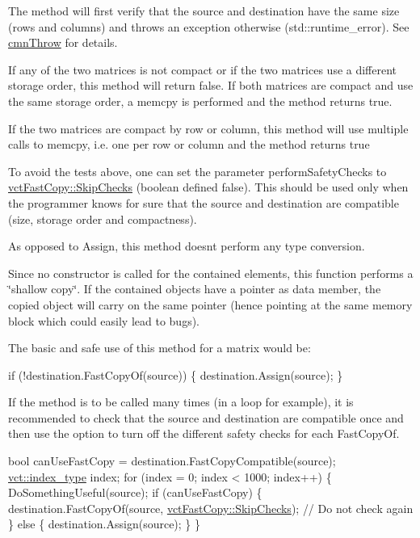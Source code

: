 \begin{DoxyItemize}
\item The method will first verify that the source and destination have the same size (rows and columns) and throws an exception otherwise ({\ttfamily std\+::runtime\+\_\+error}). See \hyperlink{cmn_throw_8h_a6fe29a0b6f112fe0032896bb904f8377}{cmn\+Throw} for details.
\item If any of the two matrices is not compact or if the two matrices use a different storage order, this method will return {\ttfamily false}. If both matrices are compact and use the same storage order, a {\ttfamily memcpy} is performed and the method returns {\ttfamily true}.
\item If the two matrices are compact by row or column, this method will use multiple calls to {\ttfamily memcpy}, i.\+e. one per row or column and the method returns {\ttfamily true}
\item To avoid the tests above, one can set the parameter {\ttfamily perform\+Safety\+Checks} to {\ttfamily \hyperlink{classvct_fast_copy_a221c1b0117c8dcf51332ad84f4e0fda5}{vct\+Fast\+Copy\+::\+Skip\+Checks}} (boolean defined {\ttfamily false}). This should be used only when the programmer knows for sure that the source and destination are compatible (size, storage order and compactness).
\item As opposed to Assign, this method doesn\textquotesingle{}t perform any type conversion.
\item Since no constructor is called for the contained elements, this function performs a \char`\"{}shallow copy\char`\"{}. If the contained objects have a pointer as data member, the copied object will carry on the same pointer (hence pointing at the same memory block which could easily lead to bugs).
\end{DoxyItemize}

The basic and safe use of this method for a matrix would be\+: 
\begin{DoxyCode}
\textcolor{keywordflow}{if} (!destination.FastCopyOf(source)) \{
    destination.Assign(source);
\}
\end{DoxyCode}


If the method is to be called many times (in a loop for example), it is recommended to check that the source and destination are compatible once and then use the option to turn off the different safety checks for each Fast\+Copy\+Of. 
\begin{DoxyCode}
\textcolor{keywordtype}{bool} canUseFastCopy = destination.FastCopyCompatible(source);
\hyperlink{namespacevct_a50405d87494dce1f22ee3930ca285ee9}{vct::index\_type} index;
\textcolor{keywordflow}{for} (index = 0; index < 1000; index++) \{
    DoSomethingUseful(source);
    \textcolor{keywordflow}{if} (canUseFastCopy) \{
        destination.FastCopyOf(source, \hyperlink{classvct_fast_copy_a221c1b0117c8dcf51332ad84f4e0fda5}{vctFastCopy::SkipChecks}); \textcolor{comment}{// Do not check
       again}
    \} \textcolor{keywordflow}{else} \{
        destination.Assign(source);
    \}
\}
\end{DoxyCode}



